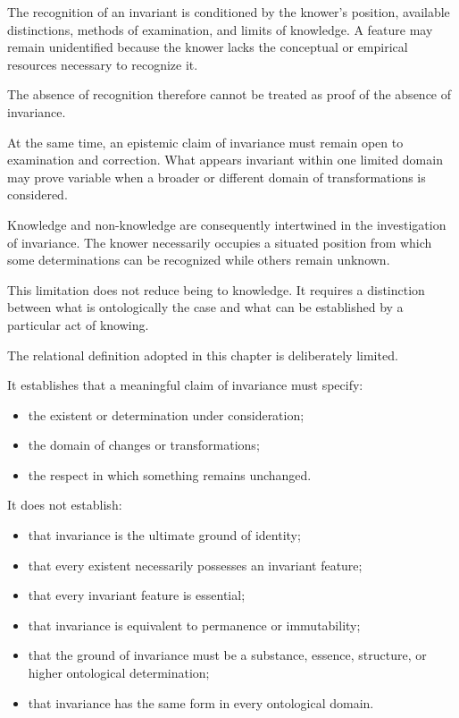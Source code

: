 The recognition of an invariant is conditioned by
the knower's position, available distinctions, methods
of examination, and limits of knowledge. A feature
may remain unidentified because the knower lacks
the conceptual or empirical resources necessary to
recognize it.

The absence of recognition therefore cannot be treated
as proof of the absence of invariance.

At the same time, an epistemic claim of invariance
must remain open to examination and correction.
What appears invariant within one limited domain
may prove variable when a broader or different domain
of transformations is considered.

Knowledge and non-knowledge are consequently intertwined
in the investigation of invariance. The knower necessarily
occupies a situated position from which some determinations
can be recognized while others remain unknown.

This limitation does not reduce being to knowledge.
It requires a distinction between what is ontologically
the case and what can be established by a particular
act of knowing.


The relational definition adopted in this chapter
is deliberately limited.

It establishes that a meaningful claim of invariance
must specify:

\begin{itemize}
    \item the existent or determination under consideration;
    \item the domain of changes or transformations;
    \item the respect in which something remains unchanged.
\end{itemize}

It does not establish:

\begin{itemize}
    \item that invariance is the ultimate ground of identity;
    \item that every existent necessarily possesses an
    invariant feature;
    \item that every invariant feature is essential;
    \item that invariance is equivalent to permanence
    or immutability;
    \item that the ground of invariance must be a substance,
    essence, structure, or higher ontological determination;
    \item that invariance has the same form in every
    ontological domain.
\end{itemize}

